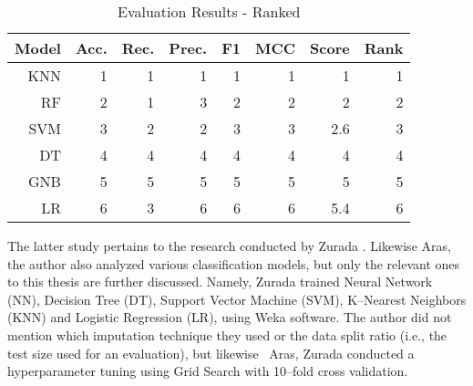 \begin{table}[H]
    \small
    \setlength{\tabcolsep}{8pt}
    \renewcommand{\arraystretch}{1.3}
    \centering
    \caption[Evaluation Results - Ranked \citep{serkan2021bagging}]{Evaluation Results - Ranked \citep{serkan2021bagging}}\label{tab:serkanresultsranks}
    \begin{tabular}{r r r r r r r r}
    \toprule
    \textbf{Model} & \textbf{Acc.} & \textbf{Rec.} & \textbf{Prec.} & \textbf{F1} & \textbf{MCC} & \textbf{Score} & \textbf{Rank} \\
    \midrule
    \hline
	
    KNN & 1 & 1 & 1 & 1 & 1 & 1 & 1 \\ 
    RF & 2 & 1 & 3 & 2 & 2 & 2 & 2 \\ 
    SVM & 3 & 2 & 2 & 3 & 3 & 2.6 & 3 \\ 
    DT & 4 & 4 & 4 & 4 & 4 & 4 & 4 \\ 
    GNB & 5 & 5 & 5 & 5 & 5 & 5 & 5 \\ 
    LR & 6 & 3 & 6 & 6 & 6 & 5.4 & 6 \\ 
	
    \hline
    \bottomrule
    \end{tabular}
    \vspace{0.35em}
    
    \vspace{-1em}
\end{table}


The latter study pertains to the research conducted by Zurada \citep{zurada2014classification}. Likewise Aras, the author also analyzed various classification models, but only the relevant ones to this thesis are further discussed.
Namely, Zurada trained Neural Network (NN), Decision Tree (DT), Support Vector Machine (SVM), K--Nearest Neighbors (KNN) and Logistic Regression (LR), using Weka software.
The author did not mention which imputation technique they used or the data split ratio (i.e., the test size used for an evaluation), but likewise  Aras, Zurada conducted a hyperparameter tuning using Grid Search with 10--fold cross validation.


